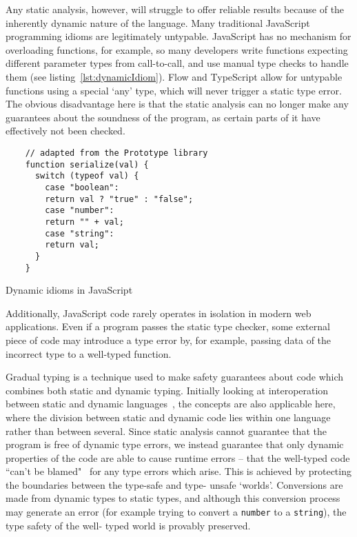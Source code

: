 \documentclass[12pt,a4paper,twoside,openright]{report}
\theoremstyle{definition}
\theoremstyle{dotless}
\begin{document}
Any static analysis, however, will struggle to offer reliable results because
of the inherently dynamic nature of the language. Many traditional JavaScript
programming idioms are legitimately untypable. JavaScript has no
mechanism for overloading functions, for example, so many developers write
functions expecting different parameter types from call-to-call, and use manual
type checks to handle them (see listing~\ref{lst:dynamicIdiom}). Flow and
TypeScript allow for untypable functions using a special `any' type, which will
never trigger a static type error. The obvious disadvantage here is that the
static analysis can no longer make any guarantees about the soundness of the
program, as certain parts of it have effectively not been checked.
\begin{program}[t]
  \begin{verbatim}
 	// adapted from the Prototype library
 	function serialize(val) {
	  switch (typeof val) {
		case "boolean":
		return val ? "true" : "false";
		case "number":
		return "" + val;
		case "string":
		return val;
	  }
 	}	
  \end{verbatim}
  \label{lst:dynamicIdiom}
  \caption{Dynamic idioms in JavaScript}
\end{program}
Additionally, JavaScript code rarely operates in isolation in modern web
applications. Even if a program passes the static type checker, some external
piece of code may introduce a type error by, for example, passing data of the
incorrect type to a well-typed function.

Gradual typing is a technique used to make safety guarantees about code which
combines both static and dynamic typing. Initially looking at interoperation
between static and dynamic languages~\cite{gray2005fine}, the concepts are
also applicable here, where the division between static and dynamic code lies
within one language rather than between several. Since static analysis cannot
guarantee that the program is free of dynamic type errors, we instead
guarantee that only dynamic properties of the code are able to cause runtime
errors -- that the well-typed code ``can't be blamed"~\cite{cantblame} for
any type errors which arise. This is achieved by protecting the boundaries
between the type-safe and type- unsafe `worlds'. Conversions are made from
dynamic types to static types, and although this conversion process may
generate an error (for example trying to convert a \texttt{number} to a
\texttt{string}), the type safety of the well- typed world is provably
preserved.
\end{document}
